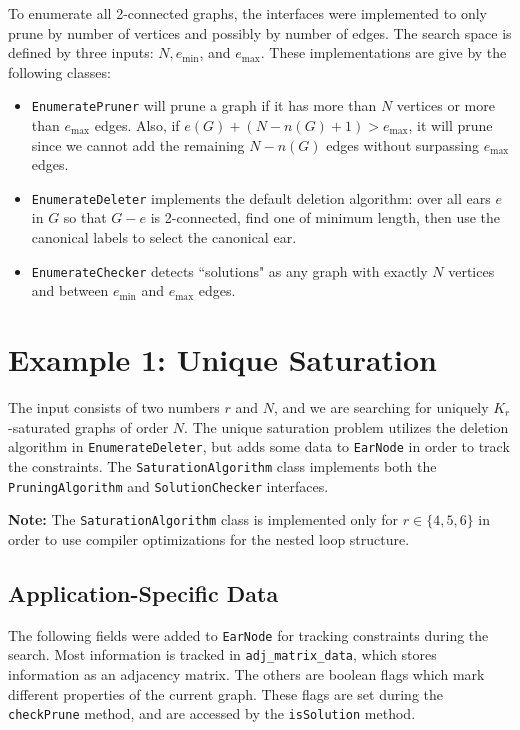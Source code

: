 \documentclass[11pt]{article}
\begin{document}
To enumerate all 2-connected graphs, the interfaces were 
	implemented to only prune by number of vertices
	and possibly by number of edges.
The search space is defined by three inputs: $N, e_{\min}$, and $e_{\max}$.
These implementations are give by the following classes:

\begin{itemize}
	\item \texttt{EnumeratePruner} will prune a graph if it has more than $N$ vertices
		or more than $e_{\max}$ edges.
		Also, if $e(G) + (N-n(G)+1) > e_{\max}$, it will prune since
			we cannot add the remaining $N-n(G)$ edges without 
			surpassing $e_{\max}$ edges.
		
	\item \texttt{EnumerateDeleter} implements the default deletion algorithm:
			over all ears $e$ in $G$ so that $G-e$ is 2-connected,
			find one of minimum length, then use the canonical labels
			to select the canonical ear.
			
	\item \texttt{EnumerateChecker} detects ``solutions" as any graph
		with exactly $N$ vertices and between $e_{\min}$ and $e_{\max}$ edges.
\end{itemize}


\section{Example 1: Unique Saturation}

The input consists of two numbers $r$ and $N$, 
	and we are searching for uniquely $K_r$-saturated graphs of order $N$.
The unique saturation problem utilizes the deletion algorithm
	in \texttt{EnumerateDeleter}, but adds some data to \texttt{EarNode}
	in order to track the constraints.
The \texttt{SaturationAlgorithm} class implements both the \texttt{PruningAlgorithm}
	and \texttt{SolutionChecker} interfaces.
	
{\bf Note:} The \texttt{SaturationAlgorithm} class is implemented 
	only for $r \in \{4,5,6\}$ in order to use compiler optimizations for
	the nested loop structure.

\subsection{Application-Specific Data}

The following fields were added to \texttt{EarNode} 
	for tracking constraints during the search.
Most information is tracked in \texttt{adj\_matrix\_data},
	which stores information as an adjacency matrix.
The others are boolean flags which mark
	different properties of the current graph.
These flags are set during the \texttt{checkPrune} method,
	and are accessed by the \texttt{isSolution} method.
\end{document}
